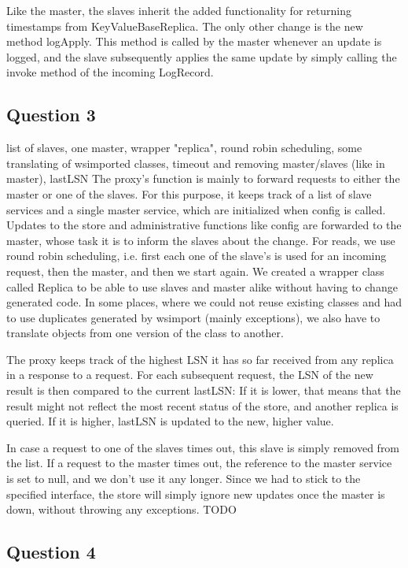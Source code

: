 \documentclass[12pt,a4paper,fleqn]{article}
\begin{document}
Like the master, the slaves inherit the added functionality for returning timestamps from KeyValueBaseReplica. The only other change  is the new method logApply. This method is called by the master whenever an update is logged, and the slave subsequently applies the same update by simply calling the invoke method of the incoming LogRecord. 

\subsection*{Question 3}
\label{sec:pq3}
list of slaves, one master, wrapper "replica", round robin scheduling, some translating of wsimported classes, timeout and removing master/slaves (like in master), lastLSN
The proxy's function is mainly to forward requests to either the master or one of the slaves. For this purpose, it keeps track of a list of slave services and a single master service, which are initialized when config is called. Updates to the store and administrative functions like config are forwarded to the master, whose task it is to inform the slaves about the change. For reads, we use round robin scheduling, i.e. first each one of the slave's is used for an incoming request, then the master, and then we start again. We created a wrapper class called Replica to be able to use slaves and master alike without having to change generated code. In some places, where we could not reuse existing classes and had to use duplicates generated by wsimport (mainly exceptions), we also have to translate objects from one version of the class to another. 

The proxy keeps track of the highest LSN it has so far received from any replica in a response to a request. For each subsequent request, the LSN of the new result is then compared to the current lastLSN: If it is lower, that means that the result might not reflect the most recent status of the store, and another replica is queried. If it is higher, lastLSN is updated to the new, higher value. 

In case a request to one of the slaves times out, this slave is simply removed from the list. If a request to the master times out, the reference to the master service is set to null, and we don't use it any longer. Since we had to stick to the specified interface, the store will simply ignore new updates once the master is down, without throwing any exceptions. TODO

\subsection*{Question 4}
\label{sec:pq4}
\end{document}
